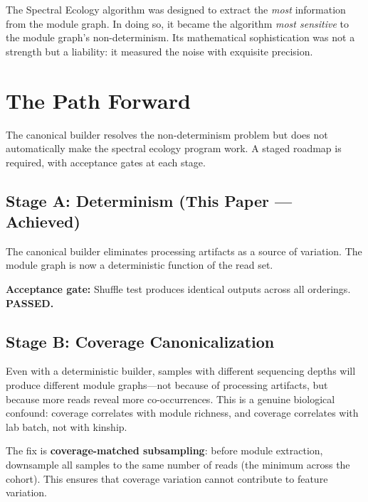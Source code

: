 \documentclass{../yalumba}
\begin{document}
\begin{limitation}
The Spectral Ecology algorithm was designed to extract the \textit{most}
information from the module graph. In doing so, it became the algorithm
\textit{most sensitive} to the module graph's non-determinism. Its
mathematical sophistication was not a strength but a liability: it measured
the noise with exquisite precision.
\end{limitation}


\section{The Path Forward}
\label{sec:forward}

The canonical builder resolves the non-determinism problem but does not
automatically make the spectral ecology program work. A staged roadmap is
required, with acceptance gates at each stage.

\subsection{Stage A: Determinism (This Paper --- Achieved)}

The canonical builder eliminates processing artifacts as a source of variation.
The module graph is now a deterministic function of the read set.

\textbf{Acceptance gate:} Shuffle test produces identical outputs across all
orderings. \textcolor{yalumba-wine}{\textbf{PASSED.}}

\subsection{Stage B: Coverage Canonicalization}

Even with a deterministic builder, samples with different sequencing depths
will produce different module graphs---not because of processing artifacts,
but because more reads reveal more co-occurrences. This is a genuine biological
confound: coverage correlates with module richness, and coverage correlates
with lab batch, not with kinship.

The fix is \textbf{coverage-matched subsampling}: before module extraction,
downsample all samples to the same number of reads (the minimum across the
cohort). This ensures that coverage variation cannot contribute to feature
variation.
\end{document}
